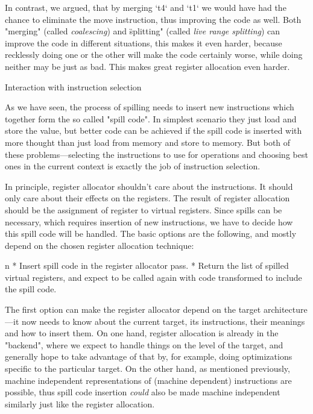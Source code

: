 In contrast, we argued, that by merging `t4` and `t1` we would have had the
chance to eliminate the move instruction, thus improving the code as well. Both
"merging" (called {\em coalescing}) and \"splitting" (called {\em live range
splitting}) can improve the code in different situations, this makes it
even harder, because recklessly doing one or the other will make the code
certainly worse, while doing neither may be just as bad. This makes great register
allocation even harder.

\seccc Interaction with instruction selection

As we have seen, the process of spilling needs to insert new instructions which
together form the so called "spill code". In simplest scenario they just load
and store the value, but better code can be achieved if the spill code is
inserted with more thought than just load from memory and store to memory. But
both of these problems---selecting the instructions to use for operations and
choosing best ones in the current context is exactly the job of instruction
selection.

In principle, register allocator shouldn't care about the instructions. It
should only care about their effects on the registers. The result of register
allocation should be the assignment of register to virtual registers. Since spills
can be necessary, which requires insertion of new instructions, we have to
decide how this spill code will be handled. The basic options are the following,
and mostly depend on the chosen register allocation technique:

\begitems\style n
* Insert spill code in the register allocator pass.
* Return the list of spilled virtual registers, and expect to be called again with
code transformed to include the spill code.
\enditems

The first option can make the register allocator depend on the target
architecture---it now needs to know about the current target, its instructions,
their meanings and how to insert them. On one hand, register allocation is
already in the "backend", where we expect to handle things on the level of the
target, and generally hope to take advantage of that by, for example, doing
optimizations specific to the particular target. On the other hand, as mentioned
previously, machine independent representations of (machine dependent)
instructions are possible, thus spill code insertion {\em could} also be made
machine independent similarly just like the register allocation.

